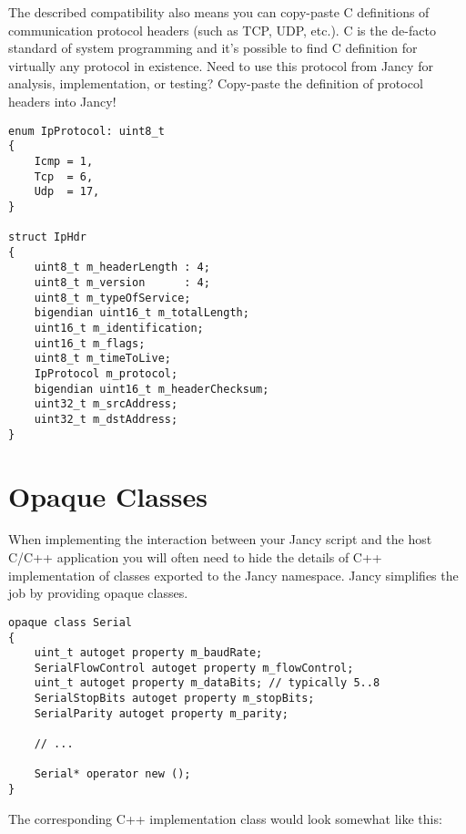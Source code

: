 \documentclass[oneside]{book}
\begin{document}
The described compatibility also means you can copy-paste C definitions of communication protocol headers (such as TCP, UDP, etc.). C is the de-facto standard of system programming and it’s possible to find C definition for virtually any protocol in existence. Need to use this protocol from Jancy for analysis, implementation, or testing? Copy-paste the definition of protocol headers into Jancy!

\begin{lstlisting}
enum IpProtocol: uint8_t
{
    Icmp = 1,
    Tcp  = 6,
    Udp  = 17,
}

struct IpHdr
{
    uint8_t m_headerLength : 4;
    uint8_t m_version      : 4;
    uint8_t m_typeOfService;
    bigendian uint16_t m_totalLength;
    uint16_t m_identification;
    uint16_t m_flags;
    uint8_t m_timeToLive;
    IpProtocol m_protocol;
    bigendian uint16_t m_headerChecksum;
    uint32_t m_srcAddress;
    uint32_t m_dstAddress;
}
\end{lstlisting}

\section{Opaque Classes}

When implementing the interaction between your Jancy script and the host C/C++ application you will often need to hide the details of C++ implementation of classes exported to the Jancy namespace. Jancy simplifies the job by providing opaque classes.

\begin{lstlisting}
opaque class Serial
{
    uint_t autoget property m_baudRate;
    SerialFlowControl autoget property m_flowControl;
    uint_t autoget property m_dataBits; // typically 5..8
    SerialStopBits autoget property m_stopBits;
    SerialParity autoget property m_parity;

    // ...

    Serial* operator new ();
}
\end{lstlisting}

The corresponding C++ implementation class would look somewhat like this:
\end{document}
